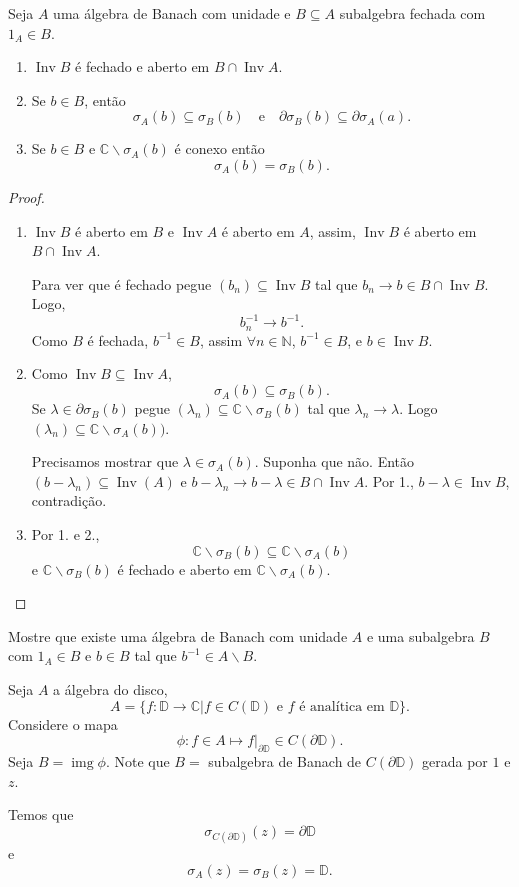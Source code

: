 \documentclass[portuguese]{article}
\theoremstyle{definition}
\newcommand{\N}{\mathbb{N}}
\newcommand{\C}{\mathbb{C}}
\DeclareMathOperator{\img}{img}
\begin{document}
\begin{teo}Seja $A$ uma álgebra de Banach com unidade e $B\subseteq A$ subalgebra fechada com $1_A\in B$.
	\begin{enumerate}
		\item $\operatorname{Inv}B$ é fechado e aberto em $B\cap \operatorname{Inv}A$.
		\item Se $b\in B$, então
		\[\sigma_A(b)\subseteq\sigma_B(b)\quad\text{e}\quad \partial\sigma_B(b)\subseteq\partial\sigma_A(a).\]
		\item Se $b\in B$ e $\C\backslash\sigma_A(b)$ é conexo então
		\[\sigma_A(b)=\sigma_B(b).\]
	\end{enumerate}
\end{teo}
\begin{proof}\leavevmode
	\begin{enumerate}
		\item $\operatorname{Inv}B$ é aberto em $B$ e $\operatorname{Inv}A$ é aberto em $A$, assim, $\operatorname{Inv}B$ é aberto em $B\cap\operatorname{Inv}A$.
		
		Para ver que é fechado pegue $(b_n)\subseteq \operatorname{Inv}B$ tal que $b_n\to b\in B\cap \operatorname{Inv}B$. Logo,
		\[b^{-1}_n\to b^{-1}.\]
		Como $B$ é fechada, $b^{-1}\in B$, assim $\forall n\in \N$, $b^{-1}\in B$, e $b\in \operatorname{Inv}B$.
		\item Como $\operatorname{Inv}B\subseteq \operatorname{Inv}A$,
		\[\sigma_A(b)\subseteq \sigma_B(b).\]
		Se $\lambda\in\partial\sigma_B(b)$ pegue $(\lambda_n)\subseteq\C\backslash\sigma_B(b)$ tal que $\lambda_n\to\lambda$. Logo $(\lambda_n)\subseteq\C\backslash\sigma_A(b))$.
		
		Precisamos mostrar que $\lambda\in \sigma_A(b)$. Suponha que não. Então $(b-\lambda_n)\subseteq \operatorname{Inv}(A)$ e $b-\lambda_n\to b-\lambda\in B\cap\operatorname{Inv}A$. Por 1., $b-\lambda\in\operatorname{Inv}B$, contradição.
		
		\item Por 1. e 2., 
		\[\C\backslash\sigma_B(b)\subseteq\C\backslash\sigma_A(b)\]
		e
		$\C\backslash\sigma_B(b)$ é fechado e aberto em $\C\backslash\sigma_A(b)$.
	\end{enumerate}
\end{proof}
\begin{exer*}
	Mostre que existe uma álgebra de Banach com unidade $A$ e uma subalgebra $B$ com $1_A\in B$ e $b\in B$ tal que $b^{-1}\in A\backslash B$.
\end{exer*}
\begin{exemplo}
	Seja $A$ a álgebra do disco,
	\[A=\{f:\mathbb{D}\to\C| f\in C(\mathbb{D}) \text{ e }f\text{ é analítica em }\mathbb{D}\}.\]
	Considere o mapa
	\[\phi:f\in A\mapsto f|_{\partial\mathbb{D}}\in C(\partial\mathbb{D}).\]
	Seja $B=\img\phi$. Note que $B=$ subalgebra de Banach de $C(\partial \mathbb{D})$ gerada por $1$ e $z$.
	
	Temos que
	\[\sigma_{C(\partial\mathbb{D})}(z)=\partial\mathbb{D}\]
	e
	\[\sigma_A(z)=\sigma_B(z)=\mathbb{D}.\]
\end{exemplo}
\end{document}
